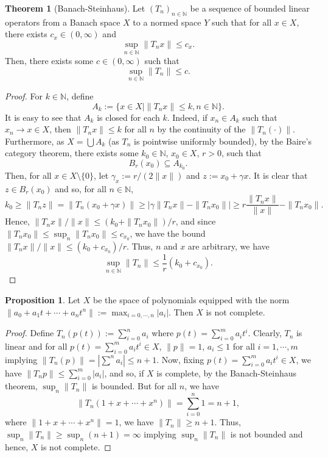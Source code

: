 \documentclass[]{article}
\theoremstyle{definition}
\newtheorem{theorem}{Theorem}
\theoremstyle{definition}
\newtheorem{proposition}{Proposition}[section]
\begin{document}
\begin{theorem}[Banach-Steinhaus]
  Let \((T_n)_{n \in \mathbb{N}}\) be a sequence of bounded linear operators 
  from a Banach space \(X\) to a normed space \(Y\) such that for all 
  \(x \in X\), there exists \(c_x \in (0, \infty)\) and 
  \[\sup_{n \in \mathbb{N}} \|T_n x\| \le c_x.\]
  Then, there exists some \(c \in (0, \infty)\) such that 
  \[\sup_{n \in \mathbb{N}} \|T_n\| \le c.\]
\end{theorem}
\begin{proof}
  For \(k \in \mathbb{N}\), define 
  \[A_k := \{x \in X \mid \|T_n x\| \le k, n \in \mathbb{N}\}.\]
  It is easy to see that \(A_k\) is closed for each \(k\). Indeed, if 
  \(x_n \in A_k\) such that \(x_n \to x \in X\), then \(\|T_n x\| \le k\) 
  for all \(n\) by the continuity of the \(\|T_n(\cdot)\|\). Furthermore, 
  as \(X = \bigcup A_k\) (as \(T_n\) is pointwise uniformly bounded), 
  by the Baire's category theorem, there exists some \(k_0 \in \mathbb{N}\),
  \(x_0 \in X\), \(r > 0\), such that 
  \[B_r(x_0) \subseteq A_{k_0}.\]
  Then, for all \(x \in X\setminus\{0\}\), let \(\gamma_x := r / (2\|x\|)\) 
  and \(z := x_0 + \gamma x\). It is clear that \(z \in B_r(x_0)\) and so, 
  for all \(n \in \mathbb{N}\),
  \[k_0 \ge \|T_n z\| = \|T_n (x_0 + \gamma x)\| \ge 
  |\gamma \|T_n x\| - \|T_n x_0\|| \ge 
  r \frac{\|T_n x\|}{\|x\|} - \|T_n x_0\|.\]
  Hence, \(\|T_n x\|/\|x\| \le (k_0 + \|T_n x_0\|)/r\), and since 
  \(\|T_n x_0\| \le \sup_n \|T_n x_0\| \le c_{x_0}\), we have the bound 
  \(\|T_n x\|/\|x\| \le (k_0 + c_{x_0})/r\). Thus, \(n\) and \(x\) are 
  arbitrary, we have 
  \[\sup_{n \in \mathbb{N}} \|T_n\| \le \frac{1}{r}(k_0 + c_{x_0}).\]
\end{proof}

\begin{proposition}
  Let \(X\) be the space of polynomials equipped with the norm 
  \(\|a_0 + a_1 t + \cdots + a_n t^n\| := \max_{i = 0, \cdots, n} |a_i|\). 
  Then \(X\) is not complete.
\end{proposition}
\begin{proof}
  Define \(T_n(p(t)) := \sum_{i = 0}^n a_i\) where \(p(t) = \sum_{i = 0}^m a_i t^i\).
  Clearly, \(T_n\) is linear and for all \(p(t) = \sum_{i = 0}^m a_i t^i\in X\), 
  \(\|p\| = 1\), \(a_i \le 1\) for all \(i = 1, \cdots, m\) implying 
  \(\|T_n(p)\| = |\sum^n a_i| \le n + 1\). Now, fixing 
  \(p(t) = \sum_{i = 0}^m a_i t^i\in X\), 
  we have \(\|T_n p\| \le \sum_{i = 0}^m |a_i|\),
  and so, if \(X\) is complete, by the Banach-Steinhaus theorem, 
  \(\sup_n \|T_n\|\) is bounded. But for all \(n\), we have 
  \[\|T_n(1 + x + \cdots + x^n)\| = \sum_{i = 0}^n 1 = n + 1,\]
  where \(\|1 + x + \cdots + x^n\| = 1\), we have \(\|T_n\| \ge n + 1\). 
  Thus, \(\sup_n \|T_n\| \ge \sup_n (n + 1) = \infty\) implying 
  \(\sup_n \|T_n\|\) is not bounded and hence, \(X\) is not complete.
\end{proof}
\end{document}
